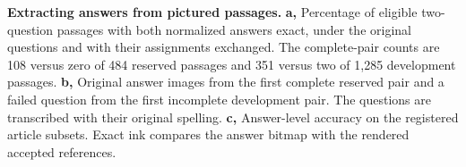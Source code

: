 \textbf{Extracting answers from pictured passages.} \textbf{a,} Percentage of eligible two-question passages with both normalized answers exact, under the original questions and with their assignments exchanged. The complete-pair counts are 108 versus zero of 484 reserved passages and 351 versus two of 1,285 development passages. \textbf{b,} Original answer images from the first complete reserved pair and a failed question from the first incomplete development pair. The questions are transcribed with their original spelling. \textbf{c,} Answer-level accuracy on the registered article subsets. Exact ink compares the answer bitmap with the rendered accepted references.

